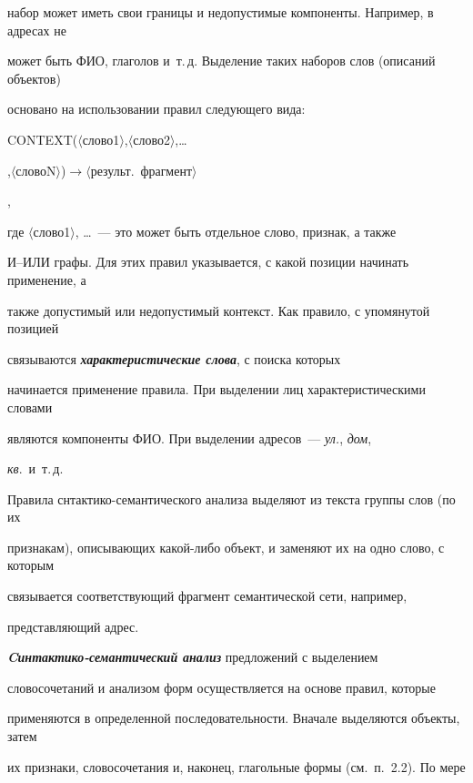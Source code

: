 набор может иметь свои границы и недопустимые компоненты. Например, в адресах не 


может быть ФИО, глаголов и~т.\,д. Выделение таких наборов слов (описаний объектов) 


основано на использовании правил следующего вида:


    


{\sf CONTEXT($\langle$слово1$\rangle$,$\langle$слово2$\rangle$,\ldots 


,$\langle$словоN$\rangle$)\;$\rightarrow$\;$\langle$результ.\ фрагмент$\rangle$},





\noindent


где $\langle$слово1$\rangle$, \ldots~--- это может быть отдельное слово, признак, а также 


И--ИЛИ графы. Для этих правил указывается, с какой позиции начинать применение, а 


также допустимый или недопустимый контекст. Как правило, с упомянутой позицией 


связываются {\bfseries\textit{характеристические слова}},  с поиска которых 


начинается применение правила. При выделении лиц характеристическими словами 


являются компоненты ФИО. При выделении адресов~--- \textit{ул.}, \textit{дом}, 


\textit{кв}.\ и~т.\,д.





Правила снтактико-семантического анализа выделяют из текста группы слов (по их 


признакам), описывающих какой-либо объект, и заменяют их на одно слово, с которым 


связывается соответствующий фрагмент семантической сети, например, 


представляющий адрес. 





{\bfseries\textit{Cинтактико-семантический анализ}} предложений с выделением 


словосочетаний и анализом форм осуществляется на основе правил, которые 


применяются в определенной последовательности. Вначале выделяются объекты, затем 


их признаки, словосочетания и, наконец, глагольные формы (см.\ п.~2.2). По мере 


